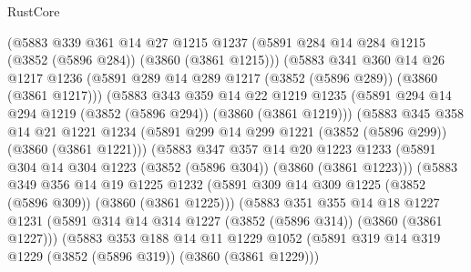 \begin{lexlean}{RustCore}
\begin{coremodule}
                (@5883
                  @339
                  @361
                  @14
                  @27
                  @1215
                  @1237
                  (@5891 @284 @14 @284 @1215 (@3852 (@5896 @284)) (@3860 (@3861 @1215)))
                  (@5883
                    @341
                    @360
                    @14
                    @26
                    @1217
                    @1236
                    (@5891 @289 @14 @289 @1217 (@3852 (@5896 @289)) (@3860 (@3861 @1217)))
                    (@5883
                      @343
                      @359
                      @14
                      @22
                      @1219
                      @1235
                      (@5891 @294 @14 @294 @1219 (@3852 (@5896 @294)) (@3860 (@3861 @1219)))
                      (@5883
                        @345
                        @358
                        @14
                        @21
                        @1221
                        @1234
                        (@5891 @299 @14 @299 @1221 (@3852 (@5896 @299)) (@3860 (@3861 @1221)))
                        (@5883
                          @347
                          @357
                          @14
                          @20
                          @1223
                          @1233
                          (@5891 @304 @14 @304 @1223 (@3852 (@5896 @304)) (@3860 (@3861 @1223)))
                          (@5883
                            @349
                            @356
                            @14
                            @19
                            @1225
                            @1232
                            (@5891 @309 @14 @309 @1225 (@3852 (@5896 @309)) (@3860 (@3861 @1225)))
                            (@5883
                              @351
                              @355
                              @14
                              @18
                              @1227
                              @1231
                              (@5891 @314 @14 @314 @1227 (@3852 (@5896 @314)) (@3860 (@3861 @1227)))
                              (@5883
                                @353
                                @188
                                @14
                                @11
                                @1229
                                @1052
                                (@5891
                                  @319
                                  @14
                                  @319
                                  @1229
                                  (@3852 (@5896 @319))
                                  (@3860 (@3861 @1229)))

\end{coremodule}
\end{lexlean}
